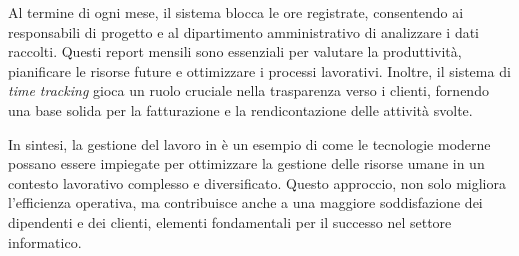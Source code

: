 \noindent Al termine di ogni mese, il sistema blocca le ore registrate, consentendo ai responsabili di progetto e al dipartimento amministrativo 
di analizzare i dati raccolti. Questi report mensili sono essenziali per valutare la produttività, pianificare le risorse future e ottimizzare 
i processi lavorativi. Inoltre, il sistema di \textit{time tracking} gioca un ruolo cruciale nella trasparenza verso i clienti, 
fornendo una base solida per la fatturazione e la rendicontazione delle attività svolte.

\noindent In sintesi, la gestione del lavoro in \azienda{} è un esempio di come le tecnologie moderne possano essere impiegate per 
ottimizzare la gestione delle risorse umane in un contesto lavorativo complesso e diversificato. Questo approccio, non solo migliora 
l'efficienza operativa, ma contribuisce anche a una maggiore soddisfazione dei dipendenti e dei clienti, elementi fondamentali per il 
successo nel settore informatico.